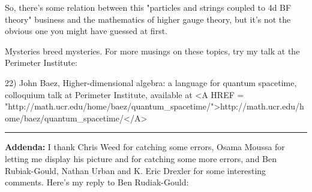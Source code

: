 So, there's some relation between this "particles and strings
coupled to 4d BF theory" business and the mathematics of higher
gauge theory, but it's not the obvious one you might have guessed
at first.

Mysteries breed mysteries.  For more musings on these topics, 
try my talk at the Perimeter Institute:

22) John Baez, Higher-dimensional algebra: a language for quantum
spacetime, colloquium talk at Perimeter Institute,
available at <A HREF = "http://math.ucr.edu/home/baez/quantum_spacetime/">http://math.ucr.edu/home/baez/quantum_spacetime/</A>

\par\noindent\rule{\textwidth}{0.4pt}
\textbf{Addenda:} I thank Chris Weed for catching some errors, Osama
Moussa for letting me display his picture and for
catching some more errors, and Ben Rubiak-Gould, Nathan Urban and 
K. Eric Drexler for some interesting comments.
Here's my reply to Ben Rudiak-Gould:




